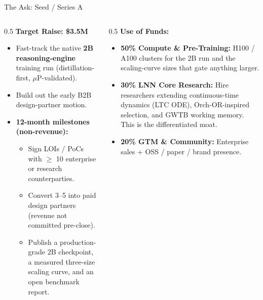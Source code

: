 \documentclass[aspectratio=169, 10pt]{beamer}
\begin{document}
\begin{frame}{The Ask: Seed / Series A}
\begin{columns}
\begin{column}{0.5\textwidth}
\textbf{Target Raise: \$3.5M}
\vspace{0.5em}
\begin{itemize}
    \item Fast-track the native \textbf{2B reasoning-engine} training run (distillation-first, $\mu$P-validated).
    \item Build out the early B2B design-partner motion.
    \item \textbf{12-month milestones (non-revenue):}
    \begin{itemize}\footnotesize
        \item Sign LOIs / PoCs with $\geq$ 10 enterprise or research counterparties.
        \item Convert 3--5 into paid design partners (revenue not committed pre-close).
        \item Publish a production-grade 2B checkpoint, a measured three-size scaling curve, and an open benchmark report.
    \end{itemize}
\end{itemize}
\end{column}
\begin{column}{0.5\textwidth}
\textbf{Use of Funds:}
\begin{itemize}
    \item \textbf{50\% Compute \& Pre-Training:} H100 / A100 clusters for the 2B run and the scaling-curve sizes that gate anything larger.
    \item \textbf{30\% LNN Core Research:} Hire researchers extending continuous-time dynamics (LTC ODE), Orch-OR-inspired selection, and GWTB working memory. This is the differentiated moat.
    \item \textbf{20\% GTM \& Community:} Enterprise sales + OSS / paper / brand presence.
\end{itemize}
\end{column}
\end{columns}
\end{frame}
\end{document}
